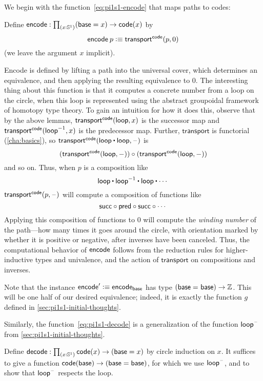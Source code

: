 %
%
%
We begin with the function~\eqref{eq:pi1s1-encode} that maps paths to codes:
\begin{defn}
Define $\encode : \prd{x : \Sn ^1} (\base=x) \rightarrow  \code(x)$ by
\[
\mathsf{encode} \: p \vcentcolon\equiv \mathsf{transport}^{\mathsf{code}}(p,0)
\]
(we leave the argument $x$ implicit).
\end{defn}
Encode is defined by lifting a path into the universal cover, which
determines an equivalence, and then applying the resulting equivalence
to $0$.
The interesting thing about this function is that it computes a concrete
number from a loop on the circle, when this loop is represented using
the abstract groupoidal framework of homotopy type theory.  To gain an
intuition for how it does this, observe that by the above lemmas,
$\mathsf{transport}^{\mathsf{code}}(\mathsf{loop},x)$ is the successor map and $\mathsf{transport}^{\mathsf{code}}(\mathord{{\mathsf{loop}}^{-1}},x)$ is the predecessor map.
Further, $\mathsf{transport}$ is functorial (\cref{cha:basics}), so
$\transfib{\code} {\lloop \ct \lloop}{\blank}$ is
\[(\mathsf{transport}^{\mathsf{code}}(\mathsf{loop},-)) \circ (\mathsf{transport}^{\mathsf{code}}(\mathsf{loop},-))\]
and so on.
Thus, when $p$ is a composition like
\[
\lloop \ct \opp \lloop \ct \lloop \ct \cdots
\]
$\mathsf{transport}^{\mathsf{code}}(p,\mathord{\hspace{1pt}\text{--}\hspace{1pt}})$ will compute a composition of functions like
\[
\mathsf{succ} \circ \mathsf{pred} \circ \mathsf{succ} \circ \cdots
\]
Applying this composition of functions to 0 will compute the
%
\emph{winding number} of the path---how many times it goes around the
circle, with orientation marked by whether it is positive or negative,
after inverses have been canceled.  Thus, the computational behavior of
$\mathsf{encode}$ follows from the reduction rules for higher-inductive types and
univalence, and the action of $\mathsf{transport}$ on compositions and inverses.

Note that the instance $\mathsf{encode}' \vcentcolon\equiv \mathsf{encode}_{\mathsf{base}}$ has type
$(\mathsf{base} =_{} \mathsf{base}) \rightarrow \mathbb{Z}$.
This will be one half of our desired equivalence; indeed, it is exactly the function $g$ defined in \cref{sec:pi1s1-initial-thoughts}.

Similarly, the function~\eqref{eq:pi1s1-decode} is a generalization of the function $\mathsf{loop}^{\mathord{\hspace{1pt}\text{--}\hspace{1pt}}}$ from \cref{sec:pi1s1-initial-thoughts}.

\begin{defn}\label{thm:pi1s1-decode}
Define $\decode : \prd{x : \Sn ^1}\code(x) \rightarrow (\base=x)$ by
circle induction on $x$.  It suffices to give a function
${\mathsf{code}(\mathsf{base}) \rightarrow (\mathsf{base}=\mathsf{base})}$, for which we use $\mathsf{loop}^{\mathord{\hspace{1pt}\text{--}\hspace{1pt}}}$, and
to show that $\mathsf{loop}^{\mathord{\hspace{1pt}\text{--}\hspace{1pt}}}$ respects the loop.
\end{defn}

